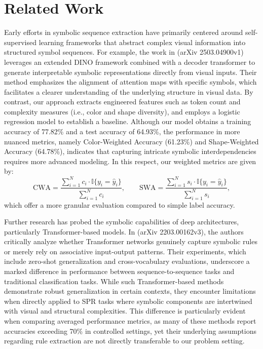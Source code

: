 \documentclass{article}
\begin{document}
\section{Related Work}
Early efforts in symbolic sequence extraction have primarily centered around self-supervised learning frameworks that abstract complex visual information into structured symbol sequences. For example, the work in (arXiv 2503.04900v1) leverages an extended DINO framework combined with a decoder transformer to generate interpretable symbolic representations directly from visual inputs. Their method emphasizes the alignment of attention maps with specific symbols, which facilitates a clearer understanding of the underlying structure in visual data. By contrast, our approach extracts engineered features such as token count and complexity measures (i.e., color and shape diversity), and employs a logistic regression model to establish a baseline. Although our model obtains a training accuracy of 77.82\% and a test accuracy of 64.93\%, the performance in more nuanced metrics, namely Color-Weighted Accuracy (61.23\%) and Shape-Weighted Accuracy (64.78\%), indicates that capturing intricate symbolic interdependencies requires more advanced modeling. In this respect, our weighted metrics are given by:
\[
\text{CWA} = \frac{\sum_{i=1}^{N} c_i \cdot \mathbb{I}\{y_i=\hat{y}_i\}}{\sum_{i=1}^{N} c_i}, \qquad \text{SWA} = \frac{\sum_{i=1}^{N} s_i \cdot \mathbb{I}\{y_i=\hat{y}_i\}}{\sum_{i=1}^{N} s_i},
\]
which offer a more granular evaluation compared to simple label accuracy.

Further research has probed the symbolic capabilities of deep architectures, particularly Transformer-based models. In (arXiv 2203.00162v3), the authors critically analyze whether Transformer networks genuinely capture symbolic rules or merely rely on associative input-output patterns. Their experiments, which include zero-shot generalization and cross-vocabulary evaluations, underscore a marked difference in performance between sequence-to-sequence tasks and traditional classification tasks. While such Transformer-based methods demonstrate robust generalization in certain contexts, they encounter limitations when directly applied to SPR tasks where symbolic components are intertwined with visual and structural complexities. This difference is particularly evident when comparing averaged performance metrics, as many of these methods report accuracies exceeding 70\% in controlled settings, yet their underlying assumptions regarding rule extraction are not directly transferable to our problem setting.
\end{document}
